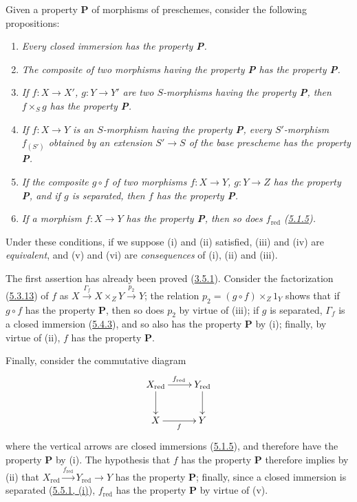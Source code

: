 \begin{remark}[5.5.12]
\label{I.5.5.12}
\normalfont Given a property \textbf{P} of morphisms of preschemes,
consider the following propositions:
\begin{enumerate}
  \item[\rm(i)] \emph{Every closed immersion has the property \textbf{P}.}
  \item[\rm(ii)] \emph{The composite of two morphisms having the property
    \textbf{P} has the property \textbf{P}.}
  \item[\rm(iii)] \emph{If $f:X\to X'$, $g:Y\to Y'$ are two $S$-morphisms
    having the property \textbf{P}, then $f\times_S g$ has the property
    \textbf{P}.}

  \item[\rm(iv)] \emph{If $f:X\to Y$ is an $S$-morphism having the
    property \textbf{P}, every $S'$-morphism $f_{(S')}$ obtained by an
    extension $S'\to S$ of the base prescheme has the property
    \textbf{P}.}
  \item[\rm(v)] \emph{If the composite $g\circ f$ of two morphisms
    $f:X\to Y$, $g:Y\to Z$ has the property \textbf{P}, and if $g$ is
    separated, then $f$ has the property \textbf{P}.}
  \item[\rm(vi)] \emph{If a morphism $f:X\to Y$ has the
    property \textbf{P}, then so does $f_{\mathrm{red}}$
    (\hyperref[I.5.1.5]{5.1.5}).}
\end{enumerate}

Under these conditions, if we suppose (i) and (ii) satisfied, (iii) and (iv)
are \emph{equivalent}, and (v) and (vi) are \emph{consequences} of (i), (ii)
and (iii).

The first assertion has already been proved
(\hyperref[I.3.5.1]{3.5.1}). Consider the factorization
(\hyperref[I.5.3.13]{5.3.13}) of $f$ as
$X\xrightarrow{\Gamma_f}X\times_Z Y\xrightarrow{p_2}Y$; the relation
$p_2=(g\circ f)\times_Z 1_Y$ shows that if $g\circ f$ has the property
\textbf{P}, then so does $p_2$ by virtue of (iii); if $g$ is separated,
$\Gamma_f$ is a closed immersion
(\hyperref[I.5.4.3]{5.4.3}), and so also has the property \textbf{P} by
(i); finally, by virtue of (ii), $f$ has the property \textbf{P}.

Finally, consider the commutative diagram
\[
  \xymatrix{
    X_{\mathrm{red}}\ar[r]^{f_{\mathrm{red}}}\ar[d] &
    Y_{\mathrm{red}}\ar[d]\\
    X\ar[r]_f &
    Y
  }
\]
where the vertical arrows are closed immersions
(\hyperref[I.5.1.5]{5.1.5}), and therefore have the property \textbf{P} by
(i). The hypothesis that $f$ has the property \textbf{P} therefore implies by
(ii) that
$X_{\mathrm{red}}\xrightarrow{f_{\mathrm{red}}}Y_{\mathrm{red}}\to Y$
has the property \textbf{P}; finally, since a closed immersion is
separated (\hyperref[I.5.5.1]{5.5.1, (i)}), $f_{\mathrm{red}}$ has the
property \textbf{P} by virtue of (v).


\end{remark}
